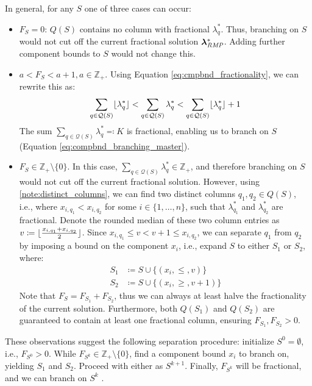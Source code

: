 In general, for any $S$ one of three cases can occur:
\begin{itemize}
\item	$F_S = 0$: $Q(S)$ contains no column with fractional $\lambda_q^*$. Thus, branching on $S$ would not cut off the current fractional solution ${\bm{\lambda}}^*_{\textit{RMP}}{}$. Adding further component bounds to $S$ would not change this.
\item	$a < F_S < a + 1, a \in \mathbb{Z}_+$. Using Equation \eqref{eq:cmpbnd_fractionality}, we can rewrite this as:
		\begin{equation}
		\sum_{q \in \mathcal{Q}(S)} \lfloor\lambda_q^*\rfloor < \sum_{q \in \mathcal{Q}(S)} \lambda_q^* < \sum_{q \in \mathcal{Q}(S)} \lfloor\lambda_q^*\rfloor + 1
		\end{equation}
		The sum $\sum_{q \in \mathcal{Q}(S)} \lambda_q^* \eqcolon K$ is fractional, enabling us to branch on $S$ (Equation \eqref{eq:compbnd_branching_master}).
\item	$F_S \in \mathbb{Z}_+ \setminus \{0\}$. In this case, $\sum_{q \in \mathcal{Q}(S)} \lambda_q^* \in \mathbb{Z}_+$, and therefore branching on $S$ would not cut off the current fractional solution. However, using \ref{note:distinct_columns}, we can find two distinct columns $q_1, q_2 \in Q(S)$, i.e., where $x_{i,q_1} < x_{i,q_2}$ for some $i \in \{1, \dots, n\}$, such that $\lambda_{q_1}^*$ and $\lambda_{q_2}^*$ are fractional. Denote the rounded median of these two column entries as $v \coloneqq \lfloor\frac{x_{i,q_1} + x_{i,q_2}}{2}\rfloor$. Since $x_{i,q_1} \leq v < v + 1 \leq x_{i,q_2}$, we can separate $q_1$ from $q_2$ by imposing a bound on the component $x_i$, i.e., expand $S$ to either $S_1$ or $S_2$, where:
		\begin{equation}
		\begin{aligned}
		S_1 &\coloneqq S \cup \{\left( x_i, \leq, v \right)\}\\
		S_2 &\coloneqq S \cup \{\left( x_i, \geq, v + 1 \right)\}
		\end{aligned}
		\end{equation}
		Note that $F_S = F_{S_1} + F_{S_2}$, thus we can always at least halve the fractionality of the current solution. Furthermore, both $Q(S_1)$ and $Q(S_2)$ are guaranteed to contain at least one fractional column, ensuring $F_{S_1}, F_{S_2} > 0$.
\end{itemize}

These observations suggest the following separation procedure: initialize $S^0 = \emptyset$, i.e., $F_{S^0} > 0$. While $F_{S^k} \in \mathbb{Z}_+ \setminus \{0\}$, find a component bound $x_i$ to branch on, yielding $S_1$ and $S_2$. Proceed with either as $S^{k+1}$. Finally, $F_{S^k}$ will be fractional, and we can branch on $S^k$ \cite{thebook}.

